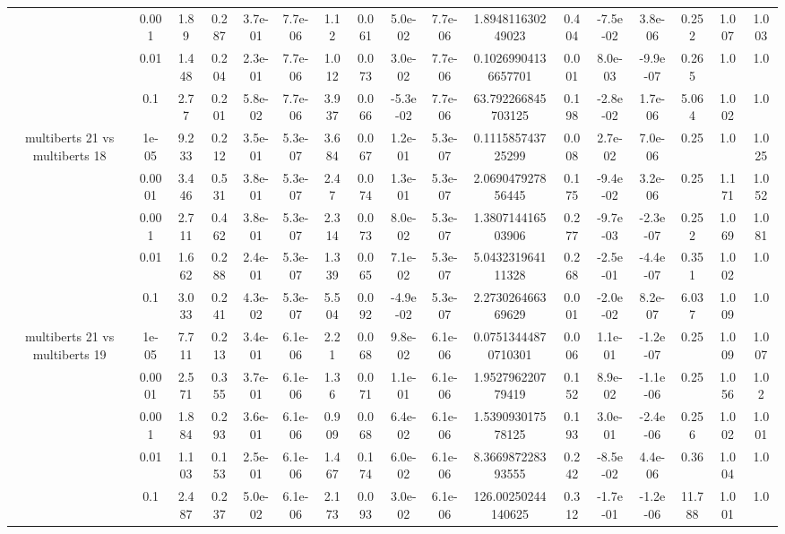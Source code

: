 \begin{tabular}{|c|c|c|c|c|c|c|c|c|c|c|c|c|c|c|c|c|}
 & 0.001 & 1.89 & 0.287 & 3.7e-01 & 7.7e-06 & 1.12 & 0.061 & 5.0e-02 & 7.7e-06 & 1.894811630249023 & 0.404 & -7.5e-02 & 3.8e-06 & 0.252 & 1.007 & 1.003 \\
 & 0.01 & 1.448 & 0.204 & 2.3e-01 & 7.7e-06 & 1.012 & 0.073 & 3.0e-02 & 7.7e-06 & 0.10269904136657701 & 0.001 & 8.0e-03 & -9.9e-07 & 0.265 & 1.0 & 1.0 \\
 & 0.1 & 2.77 & 0.201 & 5.8e-02 & 7.7e-06 & 3.937 & 0.066 & -5.3e-02 & 7.7e-06 & 63.792266845703125 & 0.198 & -2.8e-02 & 1.7e-06 & 5.064 & 1.002 & 1.0 \\
\hline
\multirow{5}{*}{multiberts 21 vs multiberts 18} & 1e-05 & 9.233 & 0.212 & 3.5e-01 & 5.3e-07 & 3.684 & 0.067 & 1.2e-01 & 5.3e-07 & 0.111585743725299 & 0.008 & 2.7e-02 & 7.0e-06 & 0.25 & 1.0 & 1.025 \\
 & 0.0001 & 3.446 & 0.531 & 3.8e-01 & 5.3e-07 & 2.47 & 0.074 & 1.3e-01 & 5.3e-07 & 2.069047927856445 & 0.175 & -9.4e-02 & 3.2e-06 & 0.25 & 1.171 & 1.052 \\
 & 0.001 & 2.711 & 0.462 & 3.8e-01 & 5.3e-07 & 2.314 & 0.073 & 8.0e-02 & 5.3e-07 & 1.380714416503906 & 0.277 & -9.7e-03 & -2.3e-07 & 0.252 & 1.069 & 1.081 \\
 & 0.01 & 1.662 & 0.288 & 2.4e-01 & 5.3e-07 & 1.339 & 0.065 & 7.1e-02 & 5.3e-07 & 5.043231964111328 & 0.268 & -2.5e-01 & -4.4e-07 & 0.351 & 1.002 & 1.0 \\
 & 0.1 & 3.033 & 0.241 & 4.3e-02 & 5.3e-07 & 5.504 & 0.092 & -4.9e-02 & 5.3e-07 & 2.273026466369629 & 0.001 & -2.0e-02 & 8.2e-07 & 6.037 & 1.009 & 1.0 \\
\hline
\multirow{5}{*}{multiberts 21 vs multiberts 19} & 1e-05 & 7.711 & 0.213 & 3.4e-01 & 6.1e-06 & 2.21 & 0.068 & 9.8e-02 & 6.1e-06 & 0.07513444870710301 & 0.006 & 1.1e-01 & -1.2e-07 & 0.25 & 1.009 & 1.007 \\
 & 0.0001 & 2.571 & 0.355 & 3.7e-01 & 6.1e-06 & 1.36 & 0.071 & 1.1e-01 & 6.1e-06 & 1.952796220779419 & 0.152 & 8.9e-02 & -1.1e-06 & 0.25 & 1.056 & 1.02 \\
 & 0.001 & 1.884 & 0.293 & 3.6e-01 & 6.1e-06 & 0.909 & 0.068 & 6.4e-02 & 6.1e-06 & 1.539093017578125 & 0.193 & 3.0e-01 & -2.4e-06 & 0.256 & 1.002 & 1.001 \\
 & 0.01 & 1.103 & 0.153 & 2.5e-01 & 6.1e-06 & 1.467 & 0.174 & 6.0e-02 & 6.1e-06 & 8.366987228393555 & 0.242 & -8.5e-02 & 4.4e-06 & 0.36 & 1.004 & 1.0 \\
 & 0.1 & 2.487 & 0.237 & 5.0e-02 & 6.1e-06 & 2.173 & 0.093 & 3.0e-02 & 6.1e-06 & 126.00250244140625 & 0.312 & -1.7e-01 & -1.2e-06 & 11.788 & 1.001 & 1.0 \\

\end{tabular}
